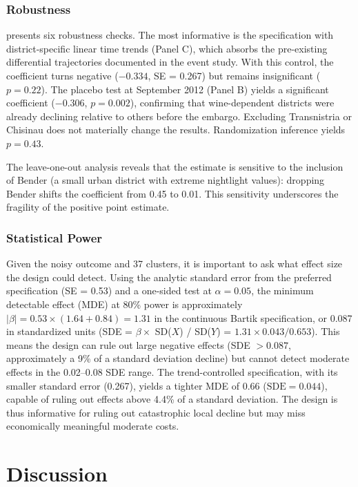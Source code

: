 \documentclass[12pt]{article}
\begin{document}
\subsubsection*{Robustness}  presents six robustness checks. The most informative is the specification with district-specific linear time trends (Panel C), which absorbs the pre-existing differential trajectories documented in the event study. With this control, the coefficient turns negative ($-0.334$, SE = 0.267) but remains insignificant ($p = 0.22$). The placebo test at September 2012 (Panel B) yields a significant coefficient ($-0.306$, $p = 0.002$), confirming that wine-dependent districts were already declining relative to others before the embargo. Excluding Transnistria or Chisinau does not materially change the results. Randomization inference yields $p = 0.43$.

The leave-one-out analysis reveals that the estimate is sensitive to the inclusion of Bender (a small urban district with extreme nightlight values): dropping Bender shifts the coefficient from 0.45 to 0.01. This sensitivity underscores the fragility of the positive point estimate.

\subsubsection*{Statistical Power} Given the noisy outcome and 37 clusters, it is important to ask what effect size the design could detect. Using the analytic standard error from the preferred specification (SE = 0.53) and a one-sided test at $\alpha = 0.05$, the minimum detectable effect (MDE) at 80\% power is approximately $|{\beta}| = 0.53 \times (1.64 + 0.84) = 1.31$ in the continuous Bartik specification, or 0.087 in standardized units (SDE = $\beta \times$ SD($X$) / SD($Y$) = $1.31 \times 0.043 / 0.653$). This means the design can rule out large negative effects (SDE $> 0.087$, approximately a 9\% of a standard deviation decline) but cannot detect moderate effects in the 0.02--0.08 SDE range. The trend-controlled specification, with its smaller standard error (0.267), yields a tighter MDE of 0.66 ($\text{SDE} = 0.044$), capable of ruling out effects above 4.4\% of a standard deviation. The design is thus informative for ruling out catastrophic local decline but may miss economically meaningful moderate costs.

\section{Discussion}
\end{document}
